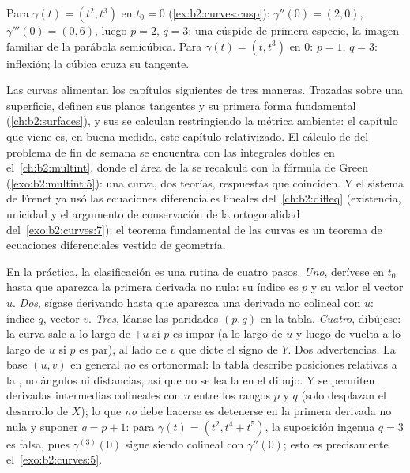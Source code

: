 \begin{example}
Para $\gamma(t) = (t^2, t^3)$ en $t_0 = 0$
(\cref{ex:b2:curves:cusp}): $\gamma'' (0)= (2, 0)$, $\gamma'''(0) =
(0, 6)$, luego $p = 2$, $q = 3$: una cúspide de primera especie, la
imagen familiar de la parábola semicúbica. Para $\gamma(t) = (t,
t^3)$ en $0$: $p = 1$, $q = 3$: inflexión; la cúbica cruza su
tangente.
\end{example}

\begin{remark}
Las curvas alimentan los capítulos siguientes de tres maneras.
Trazadas sobre una superficie, definen sus planos tangentes y su
primera forma fundamental (\cref{ch:b2:surfaces}), y sus 
se calculan restringiendo la métrica ambiente: el capítulo que viene
es, en buena medida, este capítulo relativizado. El cálculo de
 del problema de fin de semana se encuentra con las
integrales dobles en el~\cref{ch:b2:multint}, donde el área de la
 se recalcula con la fórmula de Green
(\cref{exo:b2:multint:5}): una curva, dos teorías, respuestas que
coinciden. Y el sistema de Frenet ya usó las ecuaciones diferenciales
lineales del~\cref{ch:b2:diffeq} (existencia, unicidad y el argumento
de conservación de la ortogonalidad del~\cref{exo:b2:curves:7}): el
teorema fundamental de las curvas es un teorema de ecuaciones
diferenciales vestido de geometría.
\end{remark}

\begin{remark}
En la práctica, la clasificación es una rutina de cuatro pasos.
\emph{Uno}, derívese en $t_0$ hasta que aparezca la primera derivada
no nula: su índice es $p$ y su valor el vector $u$. \emph{Dos}, sígase
derivando hasta que aparezca una derivada no colineal con $u$:
índice $q$, vector $v$. \emph{Tres}, léanse las paridades $(p, q)$ en
la tabla. \emph{Cuatro}, dibújese: la curva sale a lo largo de $+u$
si $p$ es impar (a lo largo de $u$ y luego de vuelta a lo largo de
$u$ si $p$ es par), al lado de $v$ que dicte el signo de $Y$. Dos
advertencias. La base $(u, v)$ en general \emph{no} es ortonormal: la
tabla describe posiciones relativas a la , no ángulos
ni distancias, así que no se lea la  en el dibujo. Y se
permiten derivadas intermedias colineales con $u$ entre los rangos
$p$ y $q$ (solo desplazan el desarrollo de $X$); lo que \emph{no}
debe hacerse es detenerse en la primera derivada no nula y suponer $q
= p + 1$: para $\gamma(t) = (t^2, t^4 + t^5)$, la suposición ingenua
$q = 3$ es falsa, pues $\gamma^{(3)}(0)$ sigue siendo colineal con
$\gamma''(0)$; esto es precisamente el~\cref{exo:b2:curves:5}.
\end{remark}

